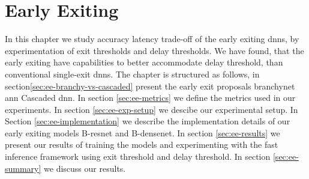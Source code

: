 \hypertarget{earlyexiting}{%
	\chapter{Early Exiting}\label{ch:earlyexit}}

In this chapter we study accuracy latency trade-off of the early exiting \gls{dnn}s, by experimentation of exit thresholds and delay thresholds. We have found, that the early exiting have capabilities to better accommodate delay threshold, than conventional single-exit \gls{dnn}s. The chapter is structured as follows, in section\ref{sec:ee-branchy-vs-cascaded}   present the early exit proposals \gls{branchynet} ann Cascaded \gls{dnn}. In section \ref{sec:ee-metrics} we define the metrics used in our experiments. In section \ref{sec:ee-exp-setup} we descibe our experimental setup. In Section \ref{sec:ee-implementation} we describe the implementation details of our early exiting models B-\gls{resnet} and B-\gls{densenet}. In section \ref{sec:ee-results} we present our results of training the models and experimenting with the fast inference framework using exit threshold and delay threshold. In section \ref{sec:ee-summary} we discuss our results.




%

